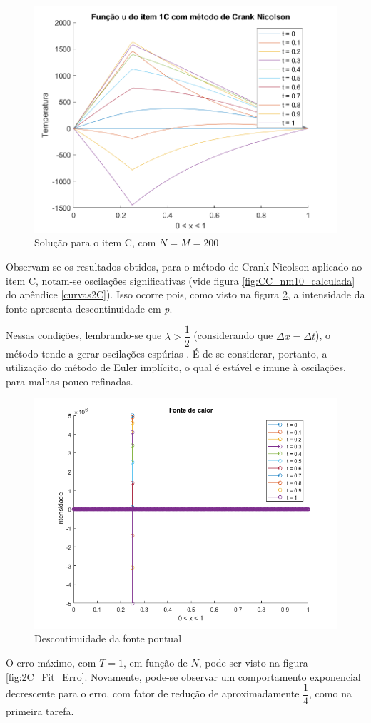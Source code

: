 \documentclass[12pt]{article}
\begin{document}
\begin{spacing}{1.5}
\begin{figure}[ht!]
    \centering
    \includegraphics[width=0.45\linewidth]{Segunda_Tarefa/ItemC/itemC_2D.png}
    \caption{Solução para o item C, com $N=M=200$}
    \label{fig:Tarefa2C_itemC_2D}
\end{figure}

Observam-se os resultados obtidos, para o método de Crank-Nicolson aplicado ao item C, notam-se oscilações significativas (vide figura \ref{fig:CC_nm10_calculada} do apêndice \ref{curvas2C}). Isso ocorre pois, como visto na figura \ref{fig:fonte_pontual}, a intensidade da fonte apresenta descontinuidade em \textit{p}. 

Nessas condições, lembrando-se que $\lambda > \dfrac{1}{2}$ (considerando que $\Delta x = \Delta t$), o método tende a gerar oscilações espúrias \supercite{osterby}. É de se considerar, portanto, a utilização do método de Euler implícito, o qual é estável e imune à oscilações, para malhas pouco refinadas.
\vspace{0.2cm}
\begin{figure}[H]
    \centering
    \includegraphics[width=0.7\linewidth]{Segunda_Tarefa/ItemC/fonte.png}
    \caption{Descontinuidade da fonte pontual}
    \label{fig:fonte_pontual}
\end{figure}

O erro máximo, com $T=1$, em função de $N$, pode ser visto na figura \ref{fig:2C_Fit_Erro}. Novamente, pode-se observar um comportamento exponencial decrescente para o erro, com fator de redução de aproximadamente $\dfrac{1}{4}$, como na primeira tarefa.



\end{spacing}
\end{document}
